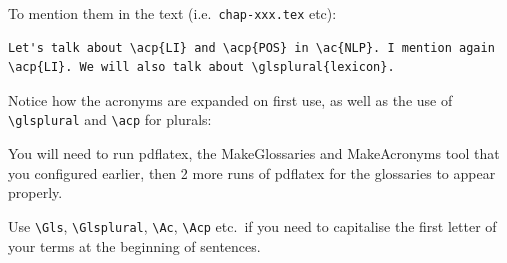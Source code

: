 \documentclass[a4paper,12pt]{scrartcl}
\begin{document}
\bigskip

To mention them in the text (i.e.~\texttt{chap-xxx.tex} etc):

\medskip

\begin{lstlisting}
Let's talk about \acp{LI} and \acp{POS} in \ac{NLP}. I mention again \acp{LI}. We will also talk about \glsplural{lexicon}.
\end{lstlisting}

\bigskip

Notice how the acronyms are expanded on first use, as well as the use of \lstinline|\glsplural| and \lstinline|\acp| for plurals:

\medskip

\fboxsep=12pt
\noindent{}

\bigskip

You will need to run \textsf{pdflatex}, the \textsf{MakeGlossaries} and \textsf{MakeAcronyms} tool that you configured earlier, then 2 more runs of \textsf{pdflatex} for the glossaries to appear properly.

Use \lstinline|\Gls|, \lstinline|\Glsplural|, \lstinline|\Ac|, \lstinline|\Acp| etc.~if you need to capitalise the first letter of your terms at the beginning of sentences.
\end{document}
